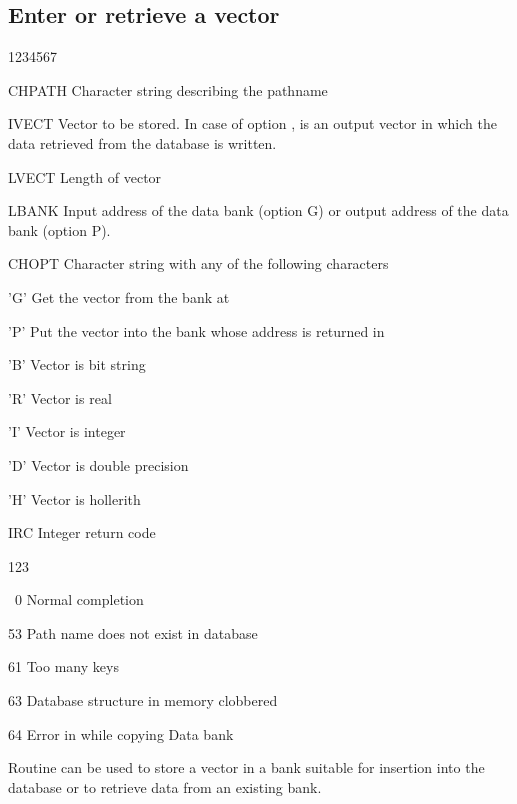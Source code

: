 \subsection{Enter or retrieve a vector}


\begin{DLtt}{1234567}
\item[CHPATH]Character string describing the pathname
\item[IVECT]Vector to be stored. In case of option ,
   is an output vector in which the data
  retrieved from the database is written.
\item[LVECT]Length of vector 
\item[LBANK]Input address of the data bank (option G) or output address
of the data bank (option P).
\item[CHOPT]Character string with any of the following characters
  \begin{DLtt}{12}
    \item['G']Get the vector from the bank at 
    \item['P']Put the vector into the bank whose address is returned in 
    \item['B']Vector is bit string
    \item['R']Vector is real
    \item['I']Vector is integer
    \item['D']Vector is double precision
    \item['H']Vector is hollerith
  \end{DLtt}
\item[IRC]Integer return code
  \begin{DLtt}{123}
  \item[\ 0]Normal completion
  \item[53]Path name does not exist in database
  \item[61]Too many keys
  \item[63]Database structure in memory clobbered
  \item[64]Error in  while copying Data bank
  \end{DLtt}
\end{DLtt}

Routine  can be used to store a vector in a bank suitable
for insertion into the database or to retrieve data from an existing
bank.

